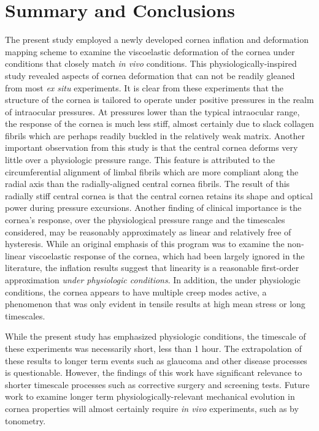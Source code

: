 \documentclass[11pt,oneside]{elsart}
\begin{document}
\section{Summary and Conclusions}
\label{sec:bulge_conclusions}

The present study employed a newly developed cornea inflation and deformation mapping scheme to examine the viscoelastic deformation of the cornea under conditions that closely match {\it in vivo} conditions.  This physiologically-inspired study revealed aspects of cornea deformation that can not be readily gleaned from most {\it ex situ} experiments.  It is clear from these experiments that the structure of the cornea is tailored to operate under positive pressures in the realm of intraocular pressures.  At pressures lower than the typical intraocular range, the response of the cornea is much less stiff, almost certainly due to slack collagen fibrils which are perhaps readily buckled in the relatively weak matrix.
Another important observation from this study is that the central cornea deforms very little over a physiologic pressure range.  This feature is attributed to the circumferential alignment of limbal fibrils which are more compliant along the radial axis than the radially-aligned central cornea fibrils.  The result of this radially stiff central cornea is that the central cornea 
retains its shape and optical power during pressure excursions.
Another finding of clinical importance is the 
cornea's response, over the physiological pressure range and
the timescales considered,
may be reasonably approximately as linear and relatively free of hysteresis.  While an original emphasis of this program was to examine the non-linear viscoelastic response of the cornea, which had been largely ignored in the literature, the inflation results suggest that linearity is a reasonable first-order approximation {\it under physiologic conditions}.
In addition, the under physiologic conditions, the cornea appears to have multiple creep modes active, a phenomenon that was only evident in tensile results at high mean stress or long timescales.  

While the present study has emphasized physiologic conditions, the timescale of these experiments was necessarily short, less than 1 hour.  The extrapolation of these results to longer term events such as glaucoma and other disease processes is questionable.   
However, the findings of this work have significant relevance to shorter
timescale processes such as corrective surgery and screening tests.  Future work to examine longer term physiologically-relevant mechanical evolution in cornea properties will almost certainly require {\it in vivo} experiments, such as by tonometry. 
\end{document}
